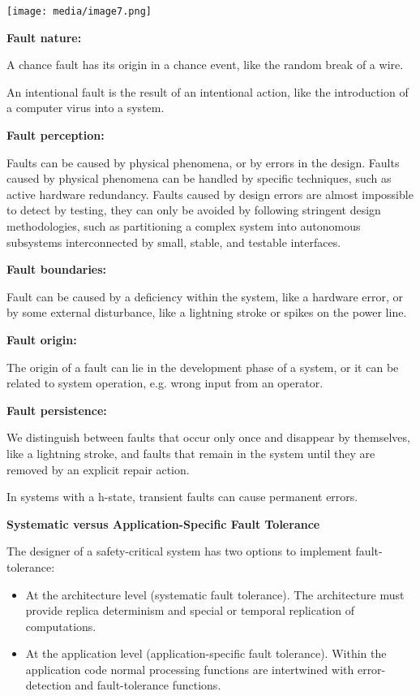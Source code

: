 \texttt{[image: media/image7.png]}

\textbf{Fault nature:}

A chance fault has its origin in a chance event, like the random break
of a wire.

An intentional fault is the result of an intentional action, like the
introduction of a computer virus into a system.

\textbf{Fault perception:}

Faults can be caused by physical phenomena, or by errors in the design.
Faults caused by physical phenomena can be handled by specific
techniques, such as active hardware redundancy. Faults caused by design
errors are almost impossible to detect by testing, they can only be
avoided by following stringent design methodologies, such as
partitioning a complex system into autonomous subsystems interconnected
by small, stable, and testable interfaces.

\textbf{Fault boundaries:}

Fault can be caused by a deficiency within the system, like a hardware
error, or by some external disturbance, like a lightning stroke or
spikes on the power line.

\textbf{Fault origin:}

The origin of a fault can lie in the development phase of a system, or
it can be related to system operation, e.g. wrong input from an
operator.

\textbf{Fault persistence:}

We distinguish between faults that occur only once and disappear by
themselves, like a lightning stroke, and faults that remain in the
system until they are removed by an explicit repair action.

In systems with a h-state, transient faults can cause permanent errors.

\textbf{Systematic versus Application-Specific Fault Tolerance}

The designer of a safety-critical system has two options to implement
fault-tolerance:

\begin{itemize}
\item
  At the architecture level (systematic fault tolerance). The
  architecture must provide replica determinism and special or temporal
  replication of computations.
\item
  At the application level (application-specific fault tolerance).
  Within the application code normal processing functions are
  intertwined with error-detection and fault-tolerance functions.
\end{itemize}


